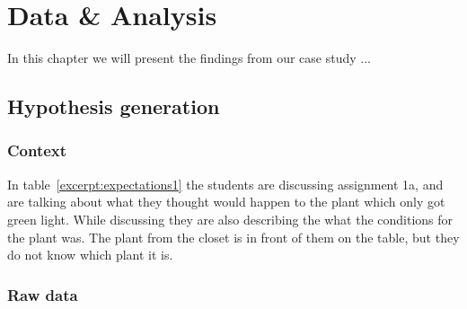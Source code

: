 \chapter{Data \& Analysis}
In this chapter we will present the findings from our case study ...

\section{Hypothesis generation}

\subsection{Context}
In table~\ref{excerpt:expectations1} the students are discussing assignment 1a, and are talking about what they thought would happen to the plant which only got green light. While discussing they are also describing the what the conditions for the plant was. The plant from the closet is in front of them on the table, but they do not know which plant it is. 
\subsection{Raw data}


